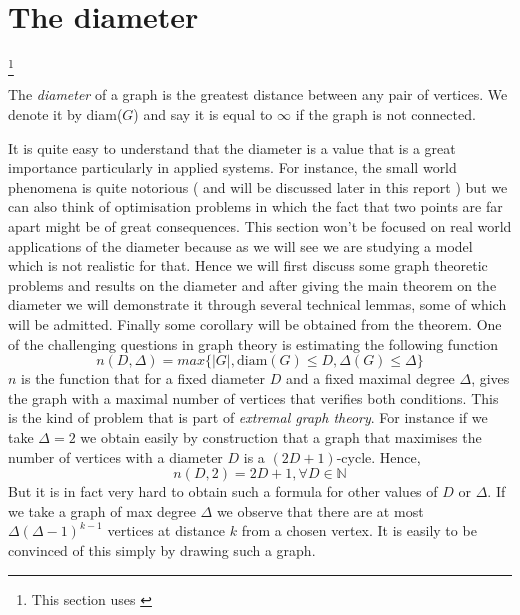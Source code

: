 \section{The diameter}\footnote{This section uses \cite{Bollob01}}

\begin{definition}
	The \emph{diameter} of a graph is the greatest distance between any pair of vertices. We denote it by diam($G$) and say it is equal to $\infty$ if the graph is not connected.
\end{definition}
It is quite easy to understand that the diameter is a value that is a great importance particularly in applied systems. For instance, the small world phenomena is quite notorious ( and will be discussed later in this report ) but we can also think of optimisation problems in which the fact that two points are far apart might be of great consequences.
This section won't be focused on real world applications of the diameter because as we will see we are studying a model which is not realistic for that. 
Hence we will first discuss some graph theoretic problems and results on the diameter and after giving the main theorem on the diameter we will demonstrate it through several technical lemmas, some of which will be admitted. Finally some corollary will be obtained from the theorem.
\newline
One of the challenging questions in graph theory is estimating the following function
\begin{equation}\label{eq:DDeltaProb}
	n(D, \Delta) = max\{ |G|, \text{diam}(G) \leq D, \Delta(G) \leq \Delta\}
\end{equation}
$n$ is the function that for a fixed diameter $D$ and a fixed maximal degree $\Delta$, gives the graph with a maximal number of vertices that verifies both conditions. This is the kind of problem that is part of \emph{extremal graph theory}.
\newline
For instance if we take $\Delta = 2$ we obtain easily by construction that a graph that maximises the number of vertices with a diameter $D$ is a $(2D+1)$-cycle. Hence, 
\begin{equation}
	n(D, 2) = 2D + 1, \forall D \in \mathbb{N}
\end{equation}
But it is in fact very hard to obtain such a formula for other values of $D$ or $\Delta$.
\newline
If we take a graph of max degree $\Delta$ we observe that there are at most $\Delta (\Delta - 1)^{k-1}$ vertices at distance $k$ from a chosen vertex. It is easily to be convinced of this simply by drawing such a graph. 
